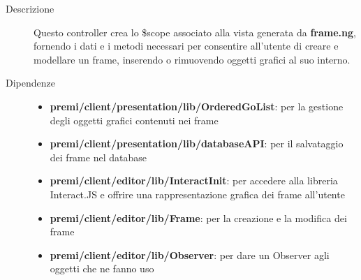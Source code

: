 \begin{description}
\item[Descrizione] \hfill
	Questo controller crea lo \$scope associato alla vista generata da \textbf{frame.ng}, fornendo i dati e i metodi necessari per consentire all'utente di creare e modellare un frame, inserendo o rimuovendo oggetti grafici al suo interno.
	
	
\item[Dipendenze] \hfill
	\begin{itemize}
		\item \textbf{premi/client/presentation/lib/OrderedGoList}: per la gestione degli oggetti grafici contenuti nei frame
		\item \textbf{premi/client/presentation/lib/databaseAPI}: per il salvataggio dei frame nel database
		\item \textbf{premi/client/editor/lib/InteractInit}: per accedere alla libreria Interact.JS e offrire una rappresentazione grafica dei frame all'utente
		\item \textbf{premi/client/editor/lib/Frame}: per la creazione e la modifica dei frame
		\item \textbf{premi/client/editor/lib/Observer}: per dare un Observer agli oggetti che ne fanno uso
	\end{itemize}
	

\end{description}
